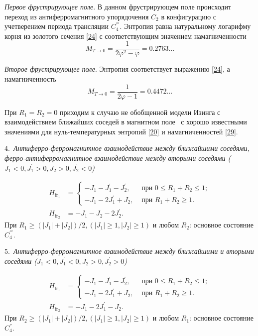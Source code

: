 \emph{Первое фрустрирующее поле}. В данном фрустрирующем поле происходит переход из антиферромагнитного упорядочения $C_2$ в конфигурацию с учетверением периода трансляции $C_4^{'''}$. Энтропия равна натуральному логарифму корня из золотого сечения \eqref{24} с соответствующим значением намагниченности
\begin{equation}
M_{T\rightarrow 0} = \frac{1}{2\varphi^2 - \varphi} = 0.2763\dots
\label{28}
\end{equation}

\emph{Второе фрустрирующее поле}. Энтропия соответствует выражению \eqref{24}, а намагниченность
\begin{equation}
M_{T\rightarrow 0} = \frac{1}{2\varphi -1} = 0.4472\dots
\label{29}
\end{equation}

При $R_1 = R_2 = 0$ приходим к случаю не обобщенной модели Изинга с взаимодействием ближайших соседей в магнитном поле~\cite{zarubin2019} с хорошо известными значениями для нуль-температурных энтропий \eqref{20} и намагниченностей \eqref{29}.

4.~\emph{Антиферро-ферромагнитное взаимодействие между ближайшими соседями, ферро-антиферромагнитное взаимодействие между вторыми соседями ($J_1<0, J_{1}^{'}>0, J_{2}>0, J_{2}^{'}<0$)}

\[
\begin{aligned}
H_{\text{fr}_1}&=
\begin{cases}
-J_1-J_1^{'}-J_{2}^{'}, & \text{ при } 0\leq R_1+R_2\leq 1 ; \\
-J_1-2J_1^{'}+J_2,   & \text{ при } R_1+R_2\ge 1 .
\end{cases}\\
H_{\text{fr}_2}&= -J_1-J_2-2J_2^{'}.
\end{aligned}
\]
При $R_1\ge (|J_1|+|J_2|)/2, (|J_1|\ge 1, |J_2|\ge 1)$ и любом $R_2$: основное состояние $C_4^{'''}$.

5.~\emph{Антиферро-ферромагнитное взаимодействие между ближайшими и вторыми соседями ($J_1<0, J_{1}^{'}<0, J_{2}>0, J_{2}^{'}>0$)}

\[
\begin{aligned}
H_{\text{fr}_1}&=
\begin{cases}
-J_1-J_1^{'}-J_{2}^{'}, & \text{ при } 0\leq R_1+R_2\leq 1 ; \\
-J_1-2J_1^{'}+J_2,   & \text{ при } R_1+R_2\ge 1 .
\end{cases}\\
H_{\text{fr}_2}&= -J_1-2J_1^{'}-J_2.
\end{aligned}
\]
При $R_2\ge (|J_1|+|J_2|)/2, (|J_1|\ge 1, |J_2|\ge 1)$ и любом $R_1$: основное состояние $C_4^{''}$.

